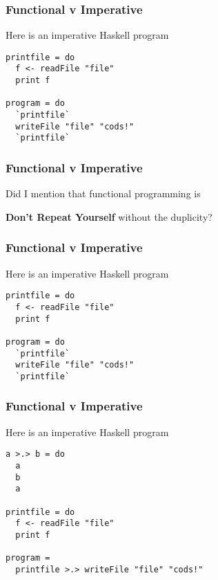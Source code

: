 \begin{frame}[fragile]
\frametitle{Functional v Imperative}
\begin{block}{Here is an imperative Haskell program}
\begin{lstlisting}[style=haskell,mathescape]
printfile = do
  f <- readFile "file"
  print f

program = do
  `printfile`
  writeFile "file" "cods!"
  `printfile`
\end{lstlisting}
\end{block}
\end{frame}


\begin{frame}[fragile]
\frametitle{Functional v Imperative}
\begin{block}{Did I mention that functional programming is}
\begin{center}
\textbf{Don't Repeat Yourself} without the duplicity?
\end{center}
\end{block}
\end{frame}


\begin{frame}[fragile]
\frametitle{Functional v Imperative}
\begin{block}{Here is an imperative Haskell program}
\begin{lstlisting}[style=haskell,mathescape]
printfile = do
  f <- readFile "file"
  print f

program = do
  `printfile`
  writeFile "file" "cods!"
  `printfile`
\end{lstlisting}
\end{block}
\end{frame}


\begin{frame}[fragile]
\frametitle{Functional v Imperative}
\begin{block}{Here is an imperative Haskell program}
\begin{lstlisting}[style=haskell,mathescape]
a >.> b = do
  a
  b
  a

printfile = do
  f <- readFile "file"
  print f

program =
  printfile >.> writeFile "file" "cods!"
\end{lstlisting}
\end{block}
\end{frame}


